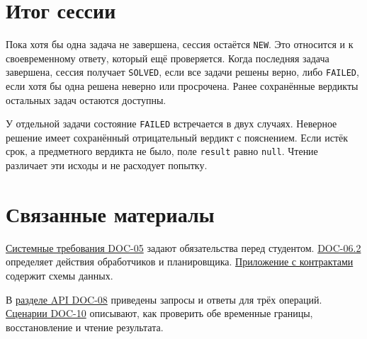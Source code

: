 \documentclass[12pt,a4paper]{article}
\begin{document}
\section{Итог сессии}\label{ux438ux442ux43eux433-ux441ux435ux441ux441ux438ux438}

\hypertarget{итог-сессии}{}

Пока хотя бы одна задача не завершена, сессия остаётся \texttt{NEW}. Это относится и к своевременному ответу, который ещё проверяется. Когда последняя задача завершена, сессия получает \texttt{SOLVED}, если все задачи решены верно, либо \texttt{FAILED}, если хотя бы одна решена неверно или просрочена. Ранее сохранённые вердикты остальных задач остаются доступны.

У отдельной задачи состояние \texttt{FAILED} встречается в двух случаях. Неверное решение имеет сохранённый отрицательный вердикт с пояснением. Если истёк срок, а предметного вердикта не было, поле \texttt{result} равно \texttt{null}. Чтение различает эти исходы и не расходует попытку.

\section{Связанные материалы}\label{ux441ux432ux44fux437ux430ux43dux43dux44bux435-ux43cux430ux442ux435ux440ux438ux430ux43bux44b}

\hypertarget{связанные-материалы}{}

{\href{../../04\_Системные\_требования/DOC-05\_Системные\_требования.pdf\#doc-05-требования-к-сессиям-задач}{Системные требования DOC-05}} задают обязательства перед студентом. {\href{../../07\_Программные\_требования/DOC-06.2\_Сессии\_задач\_и\_планировщик.pdf\#doc-062-сессии-задач-и-планировщик}{DOC-06.2}} определяет действия обработчиков и планировщика. {\href{../../07\_Программные\_требования/DOC-06.2\_Сессии\_задач\_и\_планировщик.pdf\#doc-062-контракты-сессий-задач}{Приложение с контрактами}} содержит схемы данных.

В {\href{../../09\_Архитектура\_и\_API/DOC-08\_Справочник\_API.pdf\#doc-08-справочник-api-сессии-задач}{разделе API DOC-08}} приведены запросы и ответы для трёх операций. {\href{../../10\_Верификация\_и\_тестирование/DOC-10\_План\_верификации.pdf\#doc-10-верификация-сессий-задач-и-планировщика}{Сценарии DOC-10}} описывают, как проверить обе временные границы, восстановление и чтение результата.
\end{document}

